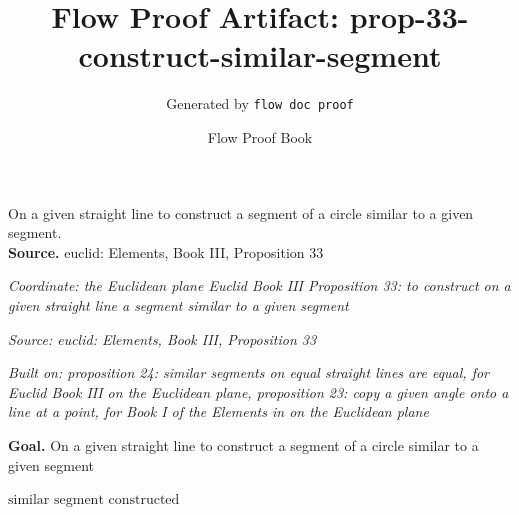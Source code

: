 \documentclass[11pt]{article}
\title{Flow Proof Artifact: prop-33-construct-similar-segment}
\author{Generated by \texttt{flow doc proof}}
\date{Flow Proof Book}
\theoremstyle{definition}
\begin{document}
\maketitle
On a given straight line to construct a segment of a circle similar to a given segment.\\[0.5em]
\textbf{Source.} euclid: Elements, Book III, Proposition 33\\[0.5em]
\bigskip
{}\par
\smallskip\noindent\textit{Coordinate: the Euclidean plane \cdot Euclid Book III \cdot Proposition 33: to construct on a given straight line a segment similar to a given segment}\par
\smallskip\noindent\textit{Source: euclid: Elements, Book III, Proposition 33}\par
\smallskip\noindent\textit{Built on: proposition 24: similar segments on equal straight lines are equal, for Euclid Book III on the Euclidean plane, proposition 23: copy a given angle onto a line at a point, for Book I of the Elements in on the Euclidean plane}\par
\medskip
\noindent\textbf{Goal.} On a given straight line to construct a segment of a circle similar to a given segment\par
\noindent$\displaystyle \text{similar segment constructed}$\par
\medskip
\noindent
\end{document}
